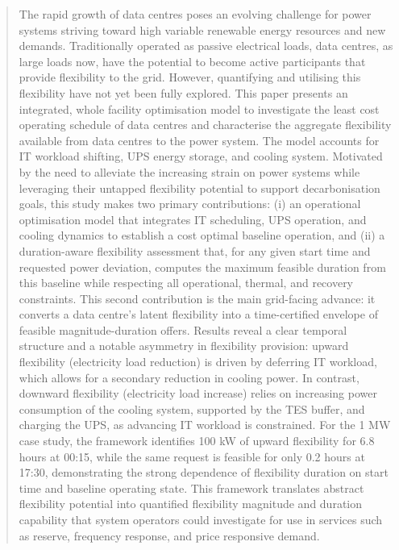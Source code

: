 \documentclass[lettersize,journal]{IEEEtran}
\newcommand{\rev}[1]{\textcolor{blue!70!black}{#1}}
\begin{document}
\begin{abstract}
The rapid growth of data centres poses an evolving challenge for power systems striving toward high variable renewable energy resources and new demands. Traditionally operated as passive electrical loads, data centres, as large loads now, have the potential to become active participants that provide flexibility to the grid. However, quantifying and utilising this flexibility have not yet been fully explored. This paper presents an integrated, whole facility optimisation model to investigate the least cost operating schedule of data centres and characterise the aggregate flexibility available from data centres to the power system. The model accounts for IT workload shifting, UPS energy storage, and cooling system. Motivated by the need to alleviate the increasing strain on power systems while leveraging their untapped flexibility potential to support decarbonisation goals, this study makes two primary contributions: (i) an operational optimisation model that integrates IT scheduling, UPS operation, and cooling dynamics to establish a cost optimal baseline operation, and \rev{(ii) a duration-aware flexibility assessment that, for any given start time and requested power deviation, computes the maximum feasible duration from this baseline while respecting all operational, thermal, and recovery constraints. This second contribution is the main grid-facing advance: it converts a data centre's latent flexibility into a time-certified envelope of feasible magnitude-duration offers.} Results reveal a clear temporal structure and a notable asymmetry in flexibility provision: upward flexibility (electricity load reduction) is driven by deferring IT workload, which allows for a secondary reduction in cooling power. In contrast, downward flexibility (electricity load increase) relies on increasing power consumption of the cooling system, supported by the TES buffer, and charging the UPS, as advancing IT workload is constrained. \rev{For the 1 MW case study, the framework identifies 100 kW of upward flexibility for 6.8 hours at 00:15, while the same request is feasible for only 0.2 hours at 17:30, demonstrating the strong dependence of flexibility duration on start time and baseline operating state.} This framework translates abstract flexibility potential into quantified flexibility magnitude and duration capability that system operators could investigate for use in services such as reserve, frequency response, and price responsive demand.
\end{abstract}
\end{document}
